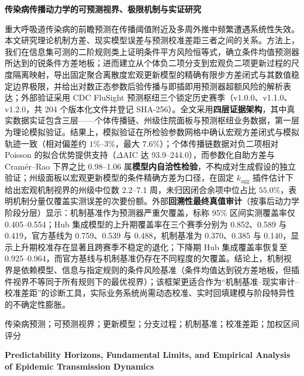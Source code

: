 \documentclass[10pt,a4paper]{article}
\theoremstyle{plain}
\theoremstyle{definition}
\begin{document}
\thispagestyle{plain}
\setcounter{section}{-1}

\begin{center}
    \vspace*{0.5em}
    {\heiti\bfseries 传染病传播动力学的可预测视界、极限机制与实证研究} \\[1.8em]
\end{center}

重大呼吸道传染病的前瞻预测在传播阈值附近及多周外推中频繁遭遇系统性失效。本文研究理论机制方差、现实模型误差与预测校准差距三者之间的关系。方法上，我们在信息集可测的二阶规则类上证明条件平方风险恒等式，确立条件均值预测器所达到的锐条件方差地板；进而建立从个体负二项分支到宏观负二项更新过程的尺度隔离映射，导出固定聚合离散度宏观更新模型的精确有限步方差闭式与其数值稳定边界极限，并给出对数正态参数后验传播与即插即用预测器超额风险的解析表达；外部验证采用 CDC FluSight 预测枢纽三个锁定历史赛季（v1.0.0、v1.1.0、v1.2.0，共 204 个版本化文件并登记 SHA-256）。全文采用\textbf{四层证据架构}，其中真实数据实证包含三层——个体传播链、州级住院面板与预测枢纽业务数据，第一层为理论模拟验证。结果上，模拟验证在所检验参数网格中确认宏观方差闭式与模拟轨迹一致（相对偏差约 $1\%$--$3\%$，最大 $7.6\%$）；个体传播链数据对负二项相对 Poisson 的拟合优势提供支持（$\Delta\text{AIC}$ 达 93.9--244.0），而参数化自助方差与 Cramér--Rao 下界之比 0.98--1.06 属\textbf{模型内自洽性检验}，不构成对生成假设的独立验证；州级面板以宏观更新模型的条件精确方差为口径，在固定 $k_{\text{agg}}$ 插件估计下给出宏观机制视界的州级中位数 2.2--7.1 周，未归因闭合余项中位占比 $55.0\%$，表明机制分量仅覆盖实测误差的次要份额。外部\textbf{回溯性最终真值审计}（按事后动力学阶段分层）显示：机制基准作为预测器严重欠覆盖，标称 95\% 区间实测覆盖率仅 0.405--0.554；Hub 集成模型的上升期覆盖率在三个赛季分别为 0.852、0.589 与 0.419，官方基线为 0.759、0.539 与 0.488，机制基准为 0.370、0.385 与 0.140，显示上升期校准存在显著且跨赛季不稳定的退化；下降期 Hub 集成覆盖率恢复至 0.925--0.964，而官方基线与机制基准仍存在不同程度的欠覆盖。结论上，机制视界是依赖模型、信息与指定规则的条件风险基准（条件均值达到锐方差地板，但插件视界不等同于所有规则下的最优视界）；该框架更适合作为“机制基准--现实审计--校准差距”的诊断工具，实际业务系统尚需动态校准、实时回填建模与阶段特异性的不确定性膨胀。

\vspace{0.8em}
传染病预测；可预测视界；更新模型；分支过程；机制基准；校准差距；加权区间评分

\vspace{1.2em}
\begin{center}
    {\heiti\bfseries Predictability Horizons, Fundamental Limits, and Empirical Analysis of Epidemic Transmission Dynamics} \\[1.0em]
\end{center}
\end{document}
